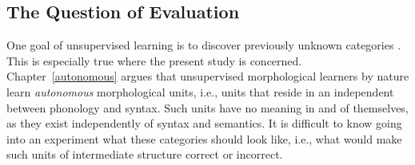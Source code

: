 
\subsection{The Question of Evaluation}  One goal of unsupervised learning is to discover previously unknown categories \citep{parsons:2004}. This is especially true where the present study is concerned. Chapter~\ref{autonomous} argues that unsupervised morphological learners by nature learn \emph{autonomous} morphological units, i.e., units that reside in an independent between phonology and syntax. Such units have no meaning in and of themselves, as they exist independently of syntax and semantics. It is difficult to know going into an experiment what these categories should look like, i.e., what would make such units of intermediate structure correct or incorrect. 

%

